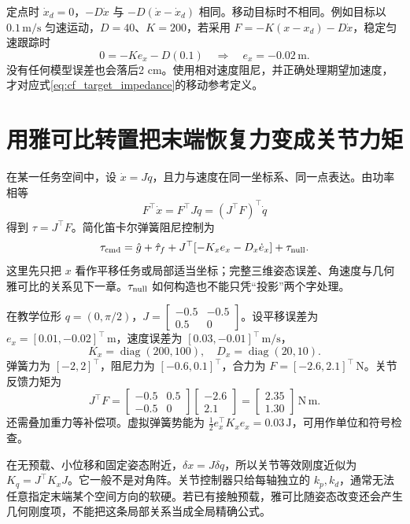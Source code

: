 定点时 $\dot x_d=0$，$-D\dot x$ 与 $-D(\dot x-\dot x_d)$ 相同。移动目标时不相同。例如目标以 $0.1\,\mathrm{m/s}$ 匀速运动，$D=40$、$K=200$，若采用 $F=-K(x-x_d)-D\dot x$，稳定匀速跟踪时
\[
0=-Ke_x-D(0.1)\quad\Longrightarrow\quad e_x=-0.02\,\mathrm{m}.
\]
没有任何模型误差也会落后2 cm。使用相对速度阻尼，并正确处理期望加速度，才对应式\eqref{eq:cf_target_impedance}的移动参考定义。

\section{用雅可比转置把末端恢复力变成关节力矩}

在某一任务空间中，设 $\dot x=J\dot q$，且力与速度在同一坐标系、同一点表达。由功率相等
\[
F^\top\dot x=F^\top J\dot q=(J^\top F)^\top\dot q
\]
得到 $\tau=J^\top F$。简化笛卡尔弹簧阻尼控制为
\begin{equation}
\tau_{\rm cmd}=\hat g+\hat\tau_f+
J^\top[-K_xe_x-D_x\dot e_x]+\tau_{\rm null}.
\label{eq:cf_simple_impedance}
\end{equation}
这里先只把 $x$ 看作平移任务或局部适当坐标；完整三维姿态误差、角速度与几何雅可比的关系见下一章。$\tau_{\rm null}$ 如何构造也不能只凭“投影”两个字处理。

\begin{examplebox}[算例 15D 两连杆的笛卡尔弹簧力矩]
在教学位形 $q=(0,\pi/2)$，$J=\left[\begin{smallmatrix}-0.5&-0.5\\0.5&0\end{smallmatrix}\right]$。设平移误差为 $e_x=[0.01,-0.02]^\top\,\mathrm{m}$，速度误差为 $[0.03,-0.01]^\top\,\mathrm{m/s}$，
\[
K_x=\operatorname{diag}(200,100),\quad
D_x=\operatorname{diag}(20,10).
\]
弹簧力为 $[-2,2]^\top$，阻尼力为 $[-0.6,0.1]^\top$，合力为 $F=[-2.6,2.1]^\top\,\mathrm{N}$。关节反馈力矩为
\[
J^\top F=
\begin{bmatrix}-0.5&0.5\\-0.5&0\end{bmatrix}
\begin{bmatrix}-2.6\\2.1\end{bmatrix}
=\begin{bmatrix}2.35\\1.30\end{bmatrix}\,\mathrm{N\,m}.
\]
还需叠加重力等补偿项。虚拟弹簧势能为 $\tfrac12e_x^\top K_xe_x=0.03\,\mathrm{J}$，可用作单位和符号检查。
\end{examplebox}

在无预载、小位移和固定姿态附近，$\delta x=J\delta q$，所以关节等效刚度近似为 $K_q=J^\top K_xJ$。它一般不是对角阵。关节控制器只给每轴独立的 $k_p,k_d$，通常无法任意指定末端某个空间方向的软硬。若已有接触预载，雅可比随姿态改变还会产生几何刚度项，不能把这条局部关系当成全局精确公式。

